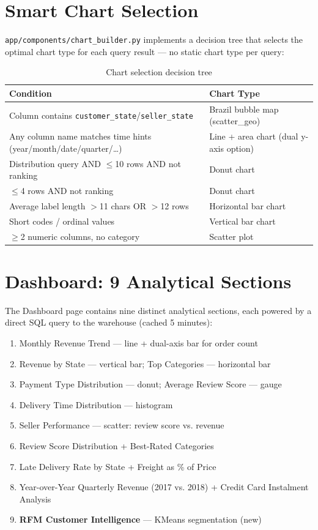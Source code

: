 \documentclass[12pt,a4paper]{report}
\begin{document}
\section{Smart Chart Selection}

\texttt{app/components/chart\_builder.py} implements a decision tree that selects the optimal
chart type for each query result — no static chart type per query:

\begin{table}[H]
  \centering
  \caption{Chart selection decision tree}
  \label{tab:charts}
  \renewcommand{\arraystretch}{1.3}
  \begin{tabularx}{\textwidth}{lX}
    \toprule
    \textbf{Condition} & \textbf{Chart Type} \\
    \midrule
    Column contains \texttt{customer\_state}/\texttt{seller\_state} & Brazil bubble map (scatter\_geo) \\
    Any column name matches time hints (year/month/date/quarter/\ldots) & Line + area chart (dual y-axis option) \\
    Distribution query AND $\leq$10 rows AND not ranking & Donut chart \\
    $\leq$4 rows AND not ranking & Donut chart \\
    Average label length $>$11 chars OR $>$12 rows & Horizontal bar chart \\
    Short codes / ordinal values & Vertical bar chart \\
    $\geq$2 numeric columns, no category & Scatter plot \\
    \bottomrule
  \end{tabularx}
\end{table}

\section{Dashboard: 9 Analytical Sections}

The Dashboard page contains nine distinct analytical sections, each powered by a direct SQL
query to the warehouse (cached 5 minutes):

\begin{enumerate}
  \item Monthly Revenue Trend — line + dual-axis bar for order count
  \item Revenue by State — vertical bar; Top Categories — horizontal bar
  \item Payment Type Distribution — donut; Average Review Score — gauge
  \item Delivery Time Distribution — histogram
  \item Seller Performance — scatter: review score vs. revenue
  \item Review Score Distribution + Best-Rated Categories
  \item Late Delivery Rate by State + Freight as \% of Price
  \item Year-over-Year Quarterly Revenue (2017 vs. 2018) + Credit Card Instalment Analysis
  \item \textbf{RFM Customer Intelligence} — KMeans segmentation (new)
\end{enumerate}
\end{document}
